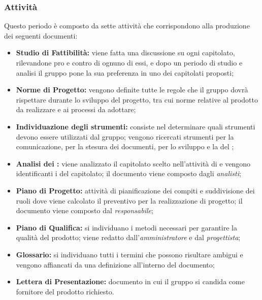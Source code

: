 \subsubsection{Attività}
Questo periodo è composto da sette attività che corrispondono alla produzione dei seguenti documenti:
\begin{itemize}
	\item \textbf{Studio di Fattibilità:} viene fatta una discussione su ogni capitolato, rilevandone pro e contro di ognuno di essi, e dopo un periodo di studio e analisi il gruppo pone la sua preferenza in uno dei capitolati proposti;
	\item \textbf{Norme di Progetto:} vengono definite tutte le regole che il gruppo dovrà rispettare durante lo sviluppo del progetto, tra cui norme relative al prodotto da realizzare e ai processi da adottare;
	\item \textbf{Individuazione degli strumenti:} consiste nel determinare quali strumenti devono essere utilizzati dal gruppo; vengono ricercati strumenti per la comunicazione, per la stesura dei documenti, per lo sviluppo e la  del ;
	\item \textbf{Analisi dei :} viene analizzato il capitolato scelto nell'attività di \SdF{} e vengono identificanti i  del capitolato; il documento viene composto dagli \textit{analisti};
	\item \textbf{Piano di Progetto:} attività di pianificazione dei compiti e suddivisione dei ruoli dove viene calcolato il preventivo per la realizzazione di progetto; il documento viene composto dal \textit{responsabile};
	\item \textbf{Piano di Qualifica:} si individuano i metodi necessari per garantire la qualità del prodotto; viene redatto dall'\textit{amministratore} e dal \textit{progettista};
	\item\textbf{Glossario:} si individuano tutti i termini che possono risultare ambigui e vengono affiancati da una definizione all'interno del documento;  
	\item \textbf{Lettera di Presentazione:} documento in cui il gruppo \Gruppo{} si candida come fornitore del prodotto  richiesto.
\end{itemize}
